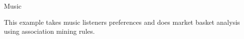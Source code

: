 \documentclass[11pt]{beamer}
\begin{document}
\begin{frame}{
	\begin{minipage}[t]{0.55\textwidth}
		Music
	\end{minipage}
	\hfill
	\begin{minipage}[t]{0.35\textwidth}
		\flushright
	\end{minipage}
}{}
This example takes music listeners preferences and does market basket analysis using association mining rules.
\begin{center}
\end{center}
\end{frame}
\end{document}
